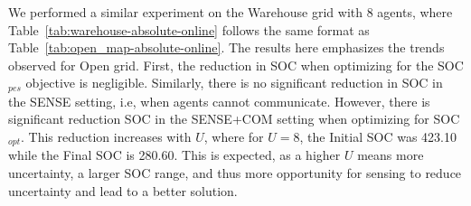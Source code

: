 \documentclass[jair,twoside,11pt,theapa]{article}
\newcommand{\sense}{SENSE\xspace}
\newcommand{\sensecom}{SENSE+COM\xspace}
\newcommand{\socopt}{SOC$_{opt}$\xspace}
\newcommand{\socpes}{SOC$_{pes}$\xspace}
\begin{document}
We performed a similar experiment on the Warehouse grid with 8 agents, where Table~\ref{tab:warehouse-absolute-online} follows the same format as Table~\ref{tab:open_map-absolute-online}. 
The results here emphasizes the trends observed for Open grid. First, the reduction in SOC when optimizing for the \socpes objective is negligible. Similarly, there is no significant reduction in SOC in the \sense setting, i.e, when agents cannot communicate. 
However, there is significant reduction SOC in the \sensecom setting when optimizing for \socopt. 
This reduction increases with $U$, where for $U=8$, the Initial SOC was {423.10} while the Final SOC is {280.60}. 
This is expected, as a higher $U$ means more uncertainty, a larger SOC range, and thus more opportunity for sensing to reduce uncertainty and lead to a better solution. %




\end{document}
